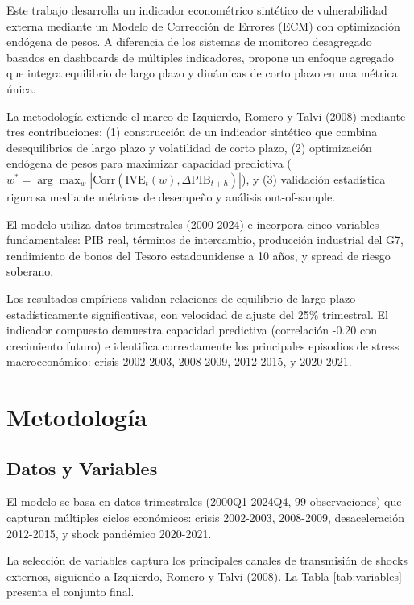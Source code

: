 \documentclass[3p,11pt]{elsarticle}
\begin{document}
Este trabajo desarrolla un indicador econométrico sintético de vulnerabilidad externa mediante un Modelo de Corrección de Errores (ECM) con optimización endógena de pesos. A diferencia de los sistemas de monitoreo desagregado basados en dashboards de múltiples indicadores, propone un enfoque agregado que integra equilibrio de largo plazo y dinámicas de corto plazo en una métrica única.

La metodología extiende el marco de Izquierdo, Romero y Talvi (2008) mediante tres contribuciones: (1) construcción de un indicador sintético que combina desequilibrios de largo plazo y volatilidad de corto plazo, (2) optimización endógena de pesos para maximizar capacidad predictiva ($w^* = \arg \max_w |\text{Corr}(\text{IVE}_t(w), \Delta \text{PIB}_{t+h})|$), y (3) validación estadística rigurosa mediante métricas de desempeño y análisis out-of-sample.

El modelo utiliza datos trimestrales (2000-2024) e incorpora cinco variables fundamentales: PIB real, términos de intercambio, producción industrial del G7, rendimiento de bonos del Tesoro estadounidense a 10 años, y spread de riesgo soberano.

Los resultados empíricos validan relaciones de equilibrio de largo plazo estadísticamente significativas, con velocidad de ajuste del 25\% trimestral. El indicador compuesto demuestra capacidad predictiva (correlación -0.20 con crecimiento futuro) e identifica correctamente los principales episodios de stress macroeconómico: crisis 2002-2003, 2008-2009, 2012-2015, y 2020-2021.

\section{Metodología}

\subsection{Datos y Variables}

El modelo se basa en datos trimestrales (2000Q1-2024Q4, 99 observaciones) que capturan múltiples ciclos económicos: crisis 2002-2003, 2008-2009, desaceleración 2012-2015, y shock pandémico 2020-2021.

La selección de variables captura los principales canales de transmisión de shocks externos, siguiendo a Izquierdo, Romero y Talvi (2008). La Tabla \ref{tab:variables} presenta el conjunto final.
\end{document}
